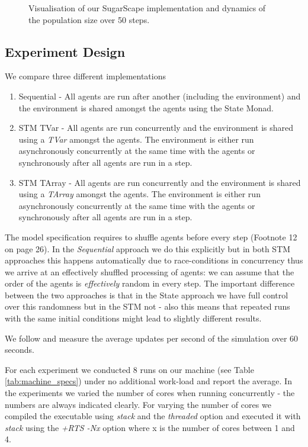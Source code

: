 \begin{figure}
\begin{center}
	\caption{Visualisation of our SugarScape implementation and dynamics of the population size over 50 steps.}
	\label{fig:vis_sugarscape}
\end{center}
\end{figure}

\subsection{Experiment Design}
We compare three different implementations

\begin{enumerate}
	\item Sequential - All agents are run after another (including the environment) and the environment is shared amongst the agents using the State Monad.
	\item STM TVar - All agents are run concurrently and the environment is shared using a \textit{TVar} amongst the agents. The environment is either run asynchronously concurrently at the same time with the agents or synchronously after all agents are run in a step.
	\item STM TArray - All agents are run concurrently and the environment is shared using a \textit{TArray} amongst the agents. The environment is either run asynchronously concurrently at the same time with the agents or synchronously after all agents are run in a step.
\end{enumerate}

The model specification requires to shuffle agents before every step (Footnote 12 on page 26). In the \textit{Sequential} approach we do this explicitly but in both STM approaches this happens automatically due to race-conditions in concurrency thus we arrive at an effectively shuffled processing of agents: we can assume that the order of the agents is \textit{effectively} random in every step. The important difference between the two approaches is that in the State approach we have full control over this randomness but in the STM not - also this means that repeated runs with the same initial conditions might lead to slightly different results.

We follow \cite{lysenko_framework_2008} and measure the average updates per second of the simulation over 60 seconds.

For each experiment we conducted 8 runs on our machine (see Table \ref{tab:machine_specs}) under no additional work-load and report the average. In the experiments we varied the number of cores when running concurrently - the numbers are always indicated clearly. For varying the number of cores we compiled the executable using \textit{stack} and the \textit{threaded} option and executed it with \textit{stack} using the \textit{+RTS -Nx} option where x is the number of cores between 1 and 4.

